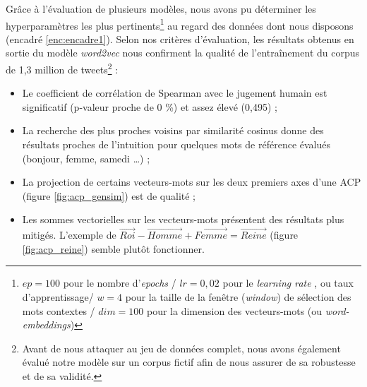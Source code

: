 \documentclass[10pt,french,french]{article}
\let\rmarkdownfootnote\footnote%
\def\footnote{\protect\rmarkdownfootnote}
\begin{document}
Grâce à l'évaluation de plusieurs modèles, nous avons pu déterminer les hyperparamètres les plus pertinents\footnote{$ep = 100$ pour le nombre d'\og \emph{epochs} \fg{} / $lr = 0,02$ pour le \og \emph{learning rate} \fg{}, ou taux d'apprentissage/ $w = 4$ pour la taille de la fenêtre (\emph{window}) de sélection des mots contextes / $dim = 100$ pour la dimension des vecteurs-mots (ou \emph{word-embeddings})} au regard des données dont nous disposons (encadré \ref{enc:encadre1}).
Selon nos critères d'évaluation, les résultats obtenus en sortie du modèle \emph{word2vec} nous confirment la qualité de l'entraînement du corpus de 1,3 million de tweets\footnote{Avant de nous attaquer au jeu de données complet, nous avons également évalué notre modèle sur un corpus fictif afin de nous assurer de sa robustesse et de sa validité.} :

\begin{itemize}
\item Le coefficient de corrélation de Spearman avec le jugement humain est significatif (p-valeur proche de 0 \%) et assez élevé (0,495) ;
\item La recherche des plus proches voisins par similarité cosinus donne des résultats proches de l'intuition pour quelques mots de référence évalués (bonjour, femme, samedi \dots) ;
\item La projection de certains vecteurs-mots sur les deux premiers axes d'une ACP (figure \ref{fig:acp_gensim}) est de qualité ;
\item Les sommes vectorielles sur les vecteurs-mots présentent des résultats plus mitigés. L'exemple de  $\overrightarrow{Roi} - \overrightarrow{Homme} + \overrightarrow{Femme} = \overrightarrow{Reine}$ (figure \ref{fig:acp_reine}) semble plutôt fonctionner. 
\end{itemize}
\end{document}
